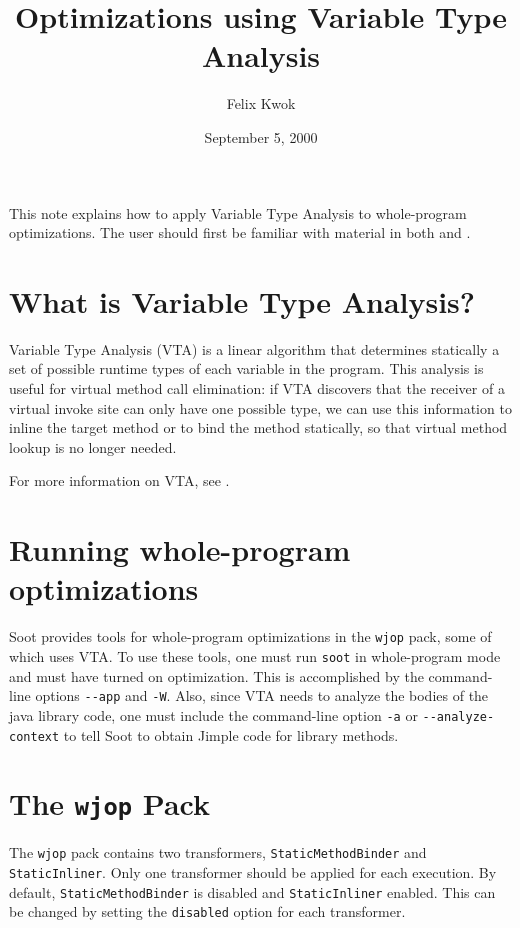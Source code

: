 \documentclass{article}
\title{Optimizations using Variable Type Analysis}
\author{Felix Kwok \htmladdnormallink{(wkwok@sable.mcgill.ca)}{mailto:wkwok@sable.mcgill.ca}}
\date{September 5, 2000}
\begin{document}
\maketitle

This note explains how to apply Variable Type Analysis to whole-program optimizations.
The user should first be familiar with material in both 
 and
.

\section{What is Variable Type Analysis?}
Variable Type Analysis (VTA) is a linear algorithm that determines statically a set of possible
runtime types of each variable in the program. This analysis is useful for virtual method call
elimination: if VTA discovers that the receiver of a virtual invoke site can only have one
possible type, we can use this information to inline the target method or to bind the method
statically, so that virtual method lookup is no longer needed.
\par For more information on VTA, see
.

\section{Running whole-program optimizations}

Soot provides tools for whole-program optimizations in the {\tt wjop} pack, some of which uses VTA. 
To use these tools, one must run {\tt soot} in whole-program mode and must have turned on optimization. This is
accomplished by the command-line options {\tt -}{\tt -app} and {\tt -W}. Also, since VTA needs to analyze the bodies
of the java library code, one must include the command-line option {\tt -a} or {\tt -}{\tt -analyze-context} to tell
Soot to obtain Jimple code for library methods.

\section{The {\tt wjop} Pack}
The {\tt wjop} pack contains two transformers, {\tt StaticMethodBinder} and {\tt StaticInliner}.
Only one transformer should be applied for each execution. By default, {\tt StaticMethodBinder}
is disabled and {\tt StaticInliner} enabled. This can be changed by setting the {\tt disabled}
option for each transformer.
\end{document}
